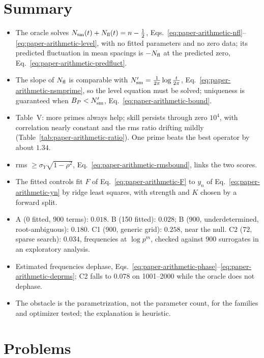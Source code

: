 \section{Summary}\label{sec:paper-arithmetic-summary}

\begin{itemize}
\item The oracle solves $N_{\mathrm{sm}}(t)+N_{\mathrm{fl}}(t)=n-\tfrac12$, Eqs.~\eqref{eq:paper-arithmetic-nfl}--\eqref{eq:paper-arithmetic-level}, with no fitted parameters and no zero data; its predicted fluctuation in mean spacings is $-N_{\mathrm{fl}}$ at the predicted zero, Eq.~\eqref{eq:paper-arithmetic-predfluct}.
\item The slope of $N_{\mathrm{fl}}$ is comparable with $N_{\mathrm{sm}}'=\frac{1}{2\pi}\log\frac{t}{2\pi}$, Eq.~\eqref{eq:paper-arithmetic-nsmprime}, so the level equation must be solved; uniqueness is guaranteed when $B_P<N_{\mathrm{sm}}'$, Eq.~\eqref{eq:paper-arithmetic-bound}.
\item Table~V: more primes always help; skill persists through zero $10^4$, with correlation nearly constant and the rms ratio drifting mildly (Table~\ref{tab:paper-arithmetic-ratio}). One prime beats the best operator by about $1.34$.
\item rms $\ge\sigma_Y\sqrt{1-\rho^2}$, Eq.~\eqref{eq:paper-arithmetic-rmsbound}, links the two scores.
\item The fitted controls fit $F$ of Eq.~\eqref{eq:paper-arithmetic-F} to $y_n$ of Eq.~\eqref{eq:paper-arithmetic-yn} by ridge least squares, with strength and $K$ chosen by a forward split.
\item A (0 fitted, 900 terms): $0.018$. B (150 fitted): $0.028$; B (900, underdetermined, root-ambiguous): $0.180$. C1 (900, generic grid): $0.258$, near the null. C2 (72, sparse search): $0.034$, frequencies at $\log p^m$, checked against 900 surrogates in an exploratory analysis.
\item Estimated frequencies dephase, Eqs.~\eqref{eq:paper-arithmetic-phase}--\eqref{eq:paper-arithmetic-deprms}; C2 falls to $0.078$ on 1001--2000 while the oracle does not dephase.
\item The obstacle is the parametrization, not the parameter count, for the families and optimizer tested; the explanation is heuristic.
\end{itemize}

\section{Problems}\label{sec:paper-arithmetic-problems}

